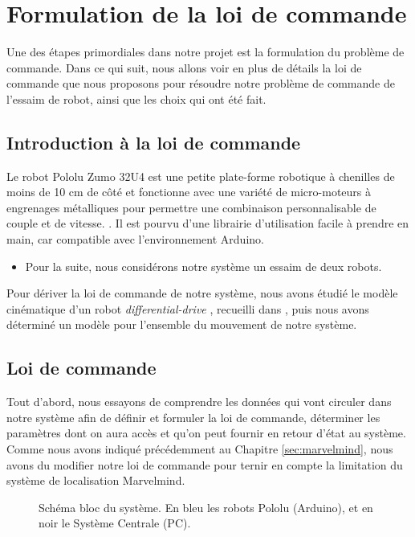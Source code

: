 \section{Formulation de la loi de commande}
Une des étapes primordiales dans notre projet est la formulation du problème de commande. Dans ce qui suit, nous allons voir en plus de détails la loi de commande que nous proposons pour résoudre notre problème de commande de l'essaim de robot, ainsi que les choix qui ont été fait.

\subsection{Introduction à la loi de commande}

Le robot Pololu Zumo 32U4 est une petite plate-forme robotique à chenilles de moins de 10 cm de côté et fonctionne avec une variété de micro-moteurs à engrenages métalliques pour permettre une combinaison personnalisable de couple et de vitesse. \cite{pololu-url}. Il est pourvu d’une librairie d’utilisation facile à prendre en main, car compatible avec l’environnement Arduino.

\begin{itemize}
    \item Pour la suite, nous considérons notre système un essaim de deux robots.
\end{itemize}

Pour dériver la loi de commande de notre système, nous avons étudié le modèle cinématique d'un robot \og  \textit{differential-drive} \fg{}, recueilli dans \cite{scaramuza}, puis nous avons déterminé un modèle pour l'ensemble du mouvement de notre système.

\subsection{Loi de commande}

Tout d'abord, nous essayons de comprendre les données qui vont circuler dans notre système afin de définir et formuler la loi de commande, déterminer les paramètres dont on aura accès et qu'on peut fournir en retour d'état au système. Comme nous avons indiqué précédemment au Chapitre \ref{sec:marvelmind}, nous avons du modifier notre loi de commande pour ternir en compte la limitation du système de localisation Marvelmind.

\begin{figure}[h!]
    \centering
    
    \caption{Schéma bloc du système. En bleu les robots Pololu (Arduino), et en noir le Système Centrale (PC).}
    \label{fig:formulation_commande}
\end{figure} \clearpage

